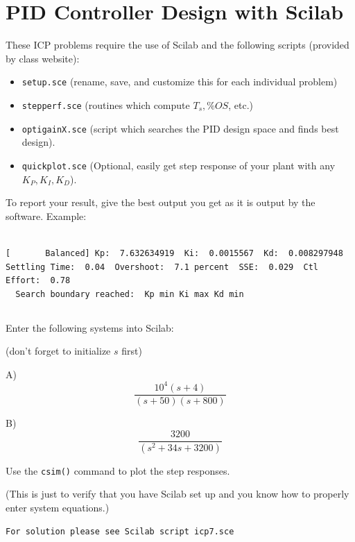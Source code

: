 \documentclass{article}	%
\begin{document}
\section{PID Controller Design with Scilab}

These ICP problems require the use of Scilab and the following scripts (provided by class website):
\begin{itemize}
\item {\tt setup.sce}  (rename, save, and customize this for each individual problem)
\item {\tt stepperf.sce} (routines which compute $T_s, \%OS$, etc.)
\item {\tt optigainX.sce} (script which searches the PID design space and finds best design).
\item {\tt quickplot.sce} (Optional, easily get step response of your plant with any $K_P,K_I,K_D$). 
\end{itemize}

To report your result, give the best output you get as it is output by the software.  Example:
\begin{verbatim}

[       Balanced] Kp:  7.632634919  Ki:  0.0015567  Kd:  0.008297948
Settling Time:  0.04  Overshoot:  7.1 percent  SSE:  0.029  Ctl Effort:  0.78
  Search boundary reached:  Kp min Ki max Kd min

\end{verbatim}
 
\subsection{}
 Enter the following systems into Scilab:

(don't forget to initialize $s$ first)

A) \[
\frac{10^4(s+4)}{(s+50)(s+800)}
\]

B) \[
\frac{3200}{(s^2+34s+3200)}
\]

Use the {\tt csim()} command to plot the step responses.

(This is just to verify that you have Scilab set up and you know how to properly enter system equations.)

\begin{solution}
{\tt For solution please see Scilab script icp7.sce }  %

\end{solution}
\end{document}
